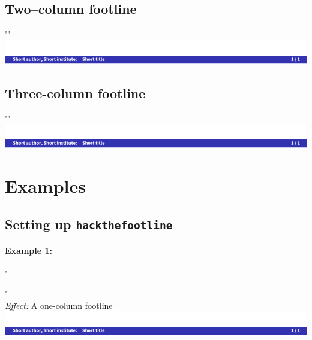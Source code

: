 \documentclass[11pt]{ltxdoc}
\begin{document}
	\subsection*{Two--column footline}
	"" \\[\smallskipamount]
	\includegraphics[page=2,width=\textwidth, trim=0 0 0 15, clip]{hackthefootline-examples}
	
	\subsection*{Three-column footline}
	"" \\[\smallskipamount]
	\includegraphics[page=3,width=\textwidth, trim=0 0 0 15, clip]{hackthefootline-examples}



	\section{Examples}
	\subsection{Setting up \texttt{hackthefootline}}\label{examples-setup}
	\paragraph{Example 1:}
	"\usepackage[onecol]{hackthefootline}" \\
	\textit{Effect:} A one-column footline \\
	\includegraphics[page=1, width=\textwidth, trim=0 0 0 15, clip]{hackthefootline-examples}
	
\end{document}
